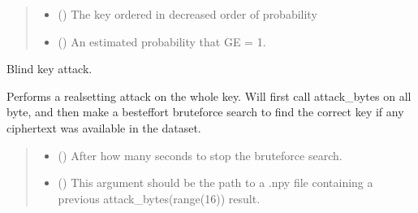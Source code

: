 \documentclass[letterpaper,10pt,english]{sphinxmanual}
\begin{document}
\begin{fulllineitems}
\begin{fulllineitems}
\begin{quote}
\begin{description}
\sphinxAtStartPar
\begin{itemize}
\item {} 
\sphinxAtStartPar
{} () \textendash{} The key ordered in decreased order of probability

\item {} 
\sphinxAtStartPar
{} () \textendash{} An estimated probability that GE = 1.

\end{itemize}


\end{description}\end{quote}

\end{fulllineitems}


\begin{fulllineitems}
\label{\detokenize{MLSCAlib.Attacks:MLSCAlib.Attacks.attack.Attack.attack_key}}
\pysigstartsignatures
{}
\pysigstopsignatures
\sphinxAtStartPar
Blind key attack.

\sphinxAtStartPar
Performs a real\sphinxhyphen{}setting attack on the whole key. Will first call attack\_bytes on all byte,
and then make a best\sphinxhyphen{}effort brute\sphinxhyphen{}force search to find the correct key if any ciphertext was
available in the dataset.
\begin{quote}\begin{description}
\begin{itemize}
\item {} 
\sphinxAtStartPar
{} (\sphinxstyleliteralemphasis{\sphinxupquote{, }}) \textendash{} After how many seconds to stop the brute\sphinxhyphen{}force search.

\item {} 
\sphinxAtStartPar
{} (\sphinxstyleliteralemphasis{\sphinxupquote{, }}) \textendash{} This argument should be the path to a .npy file containing a previous attack\_bytes(range(16))
result.


\end{itemize}
\end{description}
\end{quote}
\end{fulllineitems}
\end{fulllineitems}
\end{document}
